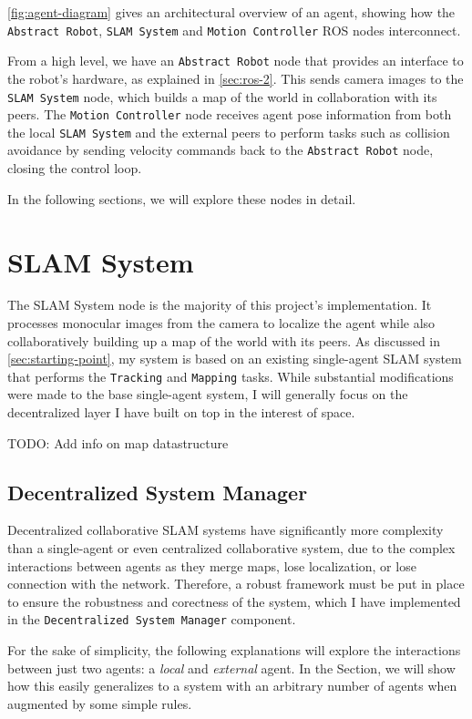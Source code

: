 \autoref{fig:agent-diagram} gives an architectural overview of an agent, showing how the \texttt{Abstract Robot}, \texttt{SLAM System} and \texttt{Motion Controller} ROS nodes interconnect.

From a high level, we have an \texttt{Abstract Robot} node that provides an interface to the robot's hardware, as explained in \autoref{sec:ros-2}. This sends camera images to the \texttt{SLAM System} node, which builds a map of the world in collaboration with its peers. The \texttt{Motion Controller} node receives agent pose information from both the local \texttt{SLAM System} and the external peers to perform tasks such as collision avoidance by sending velocity commands back to the \texttt{Abstract Robot} node, closing the control loop.

In the following sections, we will explore these nodes in detail.

\section{SLAM System}
\label{sec:slam-system}
The SLAM System node is the majority of this project's implementation. It processes monocular images from the camera to localize the agent while also collaboratively building up a map of the world with its peers. As discussed in \autoref{sec:starting-point}, my system is based on an existing single-agent SLAM system that performs the \texttt{Tracking} and \texttt{Mapping} tasks. While substantial modifications were made to the base single-agent system, I will generally focus on the decentralized layer I have built on top in the interest of space.

TODO: Add info on map datastructure

\subsection{Decentralized System Manager}
\label{sec:decentralized-system-manager}
Decentralized collaborative SLAM systems have significantly more complexity than a single-agent or even centralized collaborative system, due to the complex interactions between agents as they merge maps, lose localization, or lose connection with the network. Therefore, a robust framework must be put in place to ensure the robustness and corectness of the system, which I have implemented in the \texttt{Decentralized System Manager} component.

For the sake of simplicity, the following explanations will explore the interactions between just two agents: a \textit{local} and \textit{external} agent. In the \textit{} Section, we will show how this easily generalizes to a system with an arbitrary number of agents when augmented by some simple rules.

